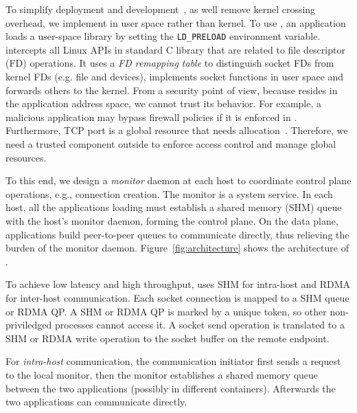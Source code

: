 To simplify deployment and development~\cite{andromeda}, as well remove kernel crossing overhead, we implement \sys in user space rather than kernel.
To use \sys, an application loads a user-space library \libipc{} by setting the \texttt{LD\_PRELOAD} environment variable. \libipc{} intercepts all Linux APIs in standard C library that are related to file descriptor (FD) operations. It uses a \emph{FD remapping table} to distinguish socket FDs from kernel FDs (e.g. file and devices), implements socket functions in user space and forwards others to the kernel.
From a security point of view, because \libipc{} resides in the application address space, we cannot trust its behavior. For example, a malicious application may bypass firewall policies if it is enforced in \libipc{}. Furthermore, TCP port is a global resource that needs allocation~\cite{lin2016scalable,nsdi19freeflow}. Therefore, we need a trusted component outside \libipc{} to enforce access control and manage global resources.

To this end, we design a \emph{monitor} daemon at each host to coordinate control plane operations, e.g., connection creation. The monitor is a system service. In each host, all the applications loading \libipc{} must establish a shared memory (SHM) queue with the host's monitor daemon, forming the control plane. On the data plane, applications build peer-to-peer queues to communicate directly, thus relieving the burden of the monitor daemon. Figure~\ref{fig:architecture} shows the architecture of \sys{}.




To achieve low latency and high throughput, \sys{} uses SHM for intra-host and RDMA for inter-host communication.
Each socket connection is mapped to a SHM queue or RDMA QP.
A SHM or RDMA QP is marked by a unique token, so other non-priviledged processes cannot access it.
A socket send operation is translated to a SHM or RDMA write operation to the socket buffer on the remote endpoint.

For \emph{intra-host} communication, the communication initiator first sends a request to the local monitor, then the monitor establishes a shared memory queue between the two applications (possibly in different containers). Afterwards the two applications can communicate directly.


